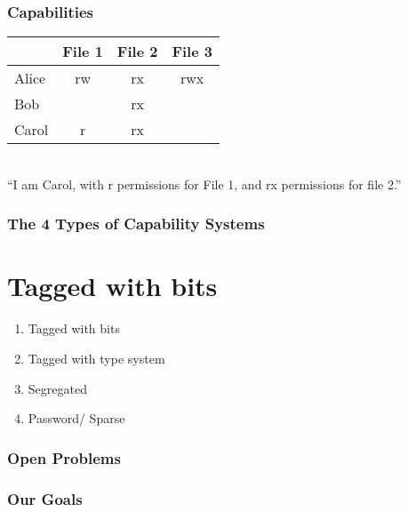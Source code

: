 \documentclass[xcolor=table]{beamer}
\begin{document}
\begin{frame}
  \frametitle{Capabilities}
  \begin{center}
    \begin{tabular}{|l||c|c|c|}
      \hline
      &File 1&File 2&File 3\\
      \hline
      \hline
      Alice&rw&rx&rwx\\
      \hline
      Bob&&rx&\\
      \hline
      \cellcolor{green}Carol&\cellcolor{green}r&\cellcolor{green}rx&\cellcolor{green}\\
      \hline
    \end{tabular}\\
    \vspace{10pt}
    ``I am Carol, with r permissions for File 1, and rx permissions for file 2.''
  \end{center}
\end{frame}

\begin{frame}
  \frametitle{The 4 Types of Capability Systems}
  \section{Tagged with bits}
  

\begin{enumerate}
    \item{Tagged with bits}
    \item{Tagged with type system}
    \item{Segregated}
    \item{Password/ Sparse}
\end{enumerate}
 \end{frame}

\begin{frame}
  \frametitle{Open Problems}
\end{frame}

\begin{frame}
  \frametitle{Our Goals}
\end{frame}
\end{document}
